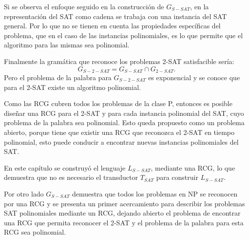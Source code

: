 \documentclass[12pt]{article}
\begin{document}
Si se observa el enfoque seguido en la construcción de $G_{S-SAT}$, en la representación del SAT como cadena se trabaja con una instancia del SAT general. Por lo que no se tienen en cuenta las propiedades específicas del problema, que en el caso de las instancias polinomiales, es lo que permite que el algoritmo para las mismas sea polinomial.

Finalmente la gramática que reconoce los problemas 2-SAT satisfacible sería:
$$G_{S-2-SAT}=G_{S-SAT}\cap G_{2-SAT}.$$
Pero el problema de la palabra para $G_{S-2-SAT}$ es exponencial y se conoce que para el 2-SAT existe un algoritmo polinomial.

Como las RCG cubren todos los problemas de la clase P, entonces es posible diseñar una RCG para el 2-SAT y para cada instancia polinomial del SAT, cuyo problema de la palabra sea polinomial. 
Esto queda propuesto como un problema abierto, porque tiene que existir una RCG que reconozca el 2-SAT en tiempo polinomial, 
esto puede conducir a encontrar nuevas instancias polinomiales del SAT.

En este capítulo se construyó el lenguaje $L_{S-SAT}$, mediante una RCG, lo que demuestra que no es necesario el transductor $T_{SAT}$ para construir $L_{S-SAT}$.

Por otro lado $G_{S-SAT}$ demuestra que todos los problemas en NP se reconocen por una RCG y se presenta un primer
acercamiento para describir los problemas SAT polinomiales mediante un RCG, dejando abierto el problema de
encontrar una RCG que permita reconocer el 2-SAT y el problema de la palabra para esta RCG sea polinomial.
\end{document}
